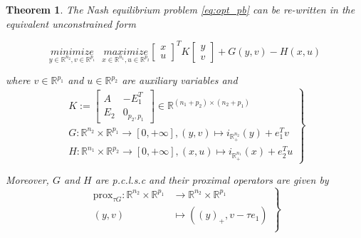 \documentclass{article} %
\newtheorem{theorem}{Theorem} \newtheorem{lemma}[theorem]{Lemma}
\begin{document}
\begin{theorem}
  The Nash equilibrium problem \eqref{eq:opt_pb} can be re-written in the equivalent unconstrained form
  
  \begin{equation}
    \underset{y \in \mathbb{R}^{n_2}, v\in \mathbb{R}^{p_1}}{minimize}\text{ }\underset{x \in \mathbb{R}^{n_1}, u \in \mathbb{R}^{p_2}}{maximize}
           {\begin{bmatrix}x\\u\end{bmatrix}^TK\begin{bmatrix}y\\v\end{bmatrix} + G(y, v) - H(x, u)}
           \label{eq:unconstrained_pb}
  \end{equation}

  where $v \in \mathbb{R}^{p_1}$ and $u \in \mathbb{R}^{p_2}$ are auxiliary variables and 
  \begin{equation}
    \left .
    \begin{split}
      K :=
      \left[
        \begin{array}{c|c}
          A & -E_1^T \\ \hline
          E_2 & 0_{p_2, p_1}
        \end{array}
        \right] \in \mathbb{R}^{(n_1 + p_2) \times (n_2 + p_1)} \\
      G: \mathbb{R}^{n_2} \times \mathbb{R}^{p_1} \rightarrow [0, +\infty], (y, v) \mapsto i_{\mathbb{R}^{n_2}_+}(y) + e_1^Tv\\
      H: \mathbb{R}^{n_1} \times \mathbb{R}^{p_2} \rightarrow [0, +\infty], (x, u) \mapsto i_{\mathbb{R}^{n_1}_+}(x) + e_2^Tu
    \end{split}
    \right\}
    \label{eq:things}
  \end{equation}
  
  Moreover, $G$ and $H$ are \textit{p.c.l.s.c} and their proximal operators are given by
  \begin{equation}
    \left .
    \begin{split}
      \text{prox}_{\tau G} : \mathbb{R}^{n_2} \times \mathbb{R}^{p_1} &\rightarrow \mathbb{R}^{n_2} \times \mathbb{R}^{p_1}\\
      (y, v) &\mapsto ((y)_+, v - \tau e_1)\\
    \end{split}
    \right\}
  \end{equation}


\end{theorem}
\end{document}
